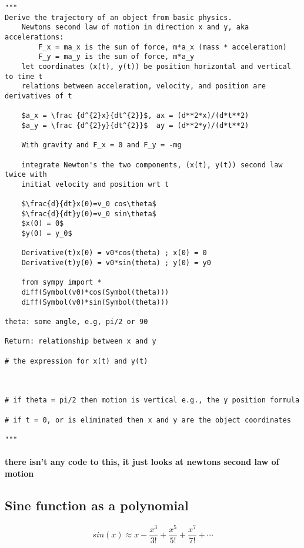 \documentclass[11pt]{article}
\begin{document}
    \begin{verbatim}
"""
Derive the trajectory of an object from basic physics.
    Newtons second law of motion in direction x and y, aka accelerations:
        F_x = ma_x is the sum of force, m*a_x (mass * acceleration)
        F_y = ma_y is the sum of force, m*a_y
    let coordinates (x(t), y(t)) be position horizontal and vertical to time t
    relations between acceleration, velocity, and position are derivatives of t

    $a_x = \frac {d^{2}x}{dt^{2}}$, ax = (d**2*x)/(d*t**2)
    $a_y = \frac {d^{2}y}{dt^{2}}$  ay = (d**2*y)/(d*t**2)

    With gravity and F_x = 0 and F_y = -mg

    integrate Newton's the two components, (x(t), y(t)) second law twice with
    initial velocity and position wrt t

    $\frac{d}{dt}x(0)=v_0 cos\theta$
    $\frac{d}{dt}y(0)=v_0 sin\theta$
    $x(0) = 0$
    $y(0) = y_0$

    Derivative(t)x(0) = v0*cos(theta) ; x(0) = 0
    Derivative(t)y(0) = v0*sin(theta) ; y(0) = y0

    from sympy import *
    diff(Symbol(v0)*cos(Symbol(theta)))
    diff(Symbol(v0)*sin(Symbol(theta)))

theta: some angle, e.g, pi/2 or 90

Return: relationship between x and y

# the expression for x(t) and y(t)



# if theta = pi/2 then motion is vertical e.g., the y position formula

# if t = 0, or is eliminated then x and y are the object coordinates

"""
\end{verbatim}

\paragraph{there isn't any code to this, it just looks at newtons second
law of
motion}\label{there-isnt-any-code-to-this-it-just-looks-at-newtons-second-law-of-motion}

    \subsection{Sine function as a
polynomial}\label{sine-function-as-a-polynomial}

\[sin(x) \approx x - \frac{x^3}{3!} + \frac{x^5}{5!} + \frac{x^7}{7!} + \dotsb\]
\end{document}

